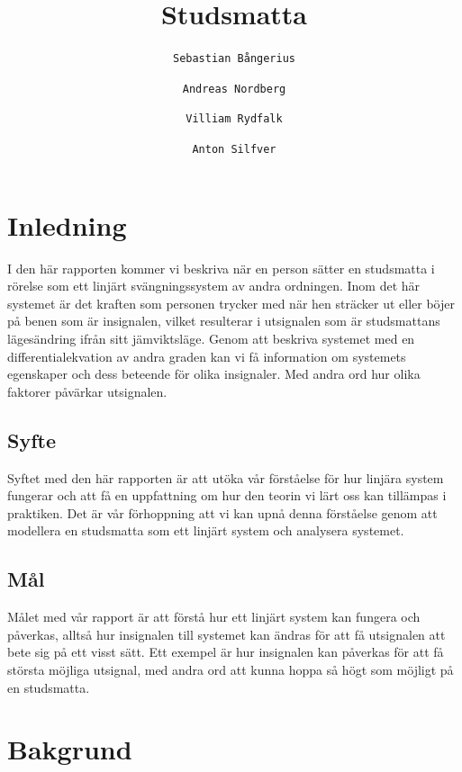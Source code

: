 \documentclass[10pt,a4paper]{article}
\author{
  \texttt{Sebastian Bångerius}
  \and
  \texttt{Andreas Nordberg}
  \and
  \texttt{Villiam Rydfalk}
  \and
  \texttt{Anton Silfver}
}
\begin{document}

\title{Studsmatta}
\maketitle

\cleardoublepage

\tableofcontents

\clearpage

\section{Inledning}
\setcounter{page}{3}

I den här rapporten kommer vi beskriva när en person sätter en studsmatta i rörelse som ett linjärt svängningssystem av andra ordningen. Inom det här systemet är det kraften som personen trycker med när hen sträcker ut eller böjer på benen som är insignalen, vilket resulterar i utsignalen som är studsmattans lägesändring ifrån sitt jämviktsläge. Genom att beskriva systemet med en differentialekvation av andra graden kan vi få information om systemets egenskaper och dess beteende för olika insignaler. Med andra ord hur olika faktorer påvärkar utsignalen.

\subsection{Syfte}
Syftet med den här rapporten är att utöka vår förståelse för hur linjära system fungerar och att få en uppfattning om hur den teorin vi lärt oss kan tillämpas i praktiken. Det är vår förhoppning att vi kan upnå denna förståelse genom att modellera en studsmatta som ett linjärt system och analysera systemet.

\subsection{Mål}
Målet med vår rapport är att förstå hur ett linjärt system kan fungera och påverkas, alltså hur insignalen till systemet kan ändras för att få utsignalen att bete sig på ett visst sätt. Ett exempel är hur insignalen kan påverkas för att få största möjliga utsignal, med andra ord att kunna hoppa så högt som möjligt på en studsmatta.

\section{Bakgrund}
\end{document}
